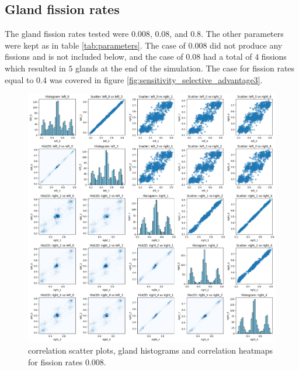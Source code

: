 \subsection{Gland fission rates}
The gland fission rates tested were $0.008$, $0.08$, and $0.8$. The other parameters were kept as in table \ref{tab:parameters}. The case of $0.008$ did not produce any fissions and is not included below, and the case of $0.08$ had a total of $4$ fissions which resulted in $5$ glands at the end of the simulation. The case for fission rates equal to $0.4$ was covered in figure \ref{fig:sensitivity_selective_advantage3}.
\begin{figure}[h]
    \centering
    \includegraphics[width=\textwidth]{Chapter_methylation/figures/sensitivity_migrate1.png}
    \caption{correlation scatter plots, gland histograms and correlation heatmaps for fission rates $0.008$.}
    \label{fig:sensitivity_migrates1}
\end{figure}
